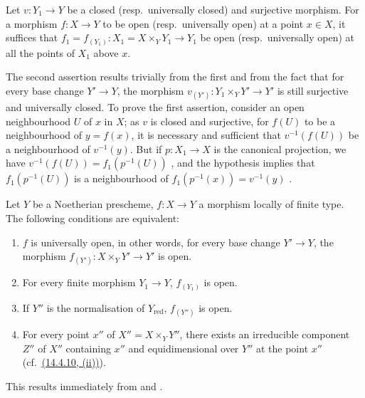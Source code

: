 \begin{lemma}[14.4.8.1]
\label{IV.14.4.8.1}
Let $v:Y_1\to Y$ be a closed (resp.\ universally closed) and surjective morphism.
For a morphism $f:X\to Y$ to be open (resp.\ universally open) at a point $x\in X$, it suffices that $f_1=f_{(Y_1)}:X_1=X\times_Y Y_1\to Y_1$ be open (resp.\ universally open) at all the points of $X_1$ above $x$.
\end{lemma}

The second assertion results trivially from the first and from the fact that for every base change $Y'\to Y$, the morphism $v_{(Y')}:Y_1\times_Y Y'\to Y'$ is still surjective and universally closed.
To prove the first assertion, consider
an open neighbourhood $U$ of $x$ in $X$; as $v$ is closed and surjective, for $f(U)$ to be a neighbourhood of $y=f(x)$, it is necessary and sufficient that $v^{-1}(f(U))$ be a neighbourhood of $v^{-1}(y)$.
But if $p:X_1\to X$ is the canonical projection, we have $v^{-1}(f(U))=f_1(p^{-1}(U))$ , and the hypothesis implies that $f_1(p^{-1}(U))$ is a neighbourhood of $f_1(p^{-1}(x))=v^{-1}(y)$ .

\begin{corollary}[14.4.9]
\label{IV.14.4.9}
Let $Y$ be a Noetherian prescheme, $f:X\to Y$ a morphism locally of finite type.
The following conditions are equivalent:
\begin{enumerate}[label=\emph{\alph*)}]
  \item $f$ is universally open, in other words, for every base change $Y'\to Y$, the morphism $f_{(Y')}:X\times_Y Y'\to Y'$ is open.
  \item[\emph{a$'$)}] For every finite morphism $Y_1\to Y$, $f_{(Y_1)}$ is open.
  \item[\emph{a$''$)}] If $Y''$ is the normalisation of $Y_{\mathrm{red}}$, $f_{(Y'')}$ is open.
  \item For every point $x''$ of $X''=X\times_Y Y''$, there exists an irreducible component $Z''$ of $X''$ containing $x''$ and equidimensional over $Y''$ at the point $x''$ (cf.\ {\hyperlink{ega4.c04.item.14-4-10}{(14.4.10, (ii))}}).
\end{enumerate}
\end{corollary}

This results immediately from  and .

